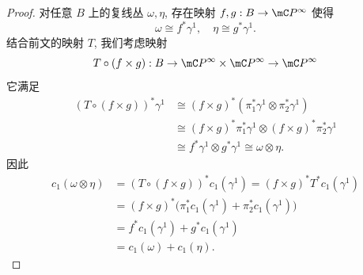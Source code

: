\begin{proof}
        \noindent{} 对任意 $B$ 上的复线丛 $\omega,\eta$, 存在映射 $f,g:B\rightarrow\mC P^{\infty}$ 使得 
        \begin{equation*}
            \omega \cong f^*\gamma^1,\quad \eta \cong g^*\gamma^1.
        \end{equation*}
        结合前文的映射 $T$, 我们考虑映射
        \begin{equation*}
            T\circ(f\times g):B\rightarrow\mC P^{\infty}\times\mC P^{\infty}\rightarrow\mC P^{\infty}
        \end{equation*}
        它满足
        \begin{align*}
            (T\circ(f\times g))^*\gamma^1 & \cong  (f\times g)^*(\pi_1^*\gamma^1\otimes \pi_2^*\gamma^1) \\
            & \cong  (f\times g)^*\pi_1^*\gamma^1\otimes (f\times g)^*\pi_2^*\gamma^1 \\
            & \cong f^*\gamma^1\otimes g^*\gamma^1 \cong \omega\otimes\eta.
        \end{align*}
        因此
        \begin{align*}
            c_1(\omega\otimes\eta) & = (T\circ(f\times g))^*c_1(\gamma^1) = (f\times g)^*T^*c_1(\gamma^1) \\
            & = (f\times g)^*\bigl(\pi_1^*c_1(\gamma^1) + \pi_2^*c_1(\gamma^1)\bigr) \\
            & = f^*c_1(\gamma^1) + g^*c_1(\gamma^1) \\
            & = c_1(\omega) + c_1(\eta).
        \end{align*}
    \end{proof}

        